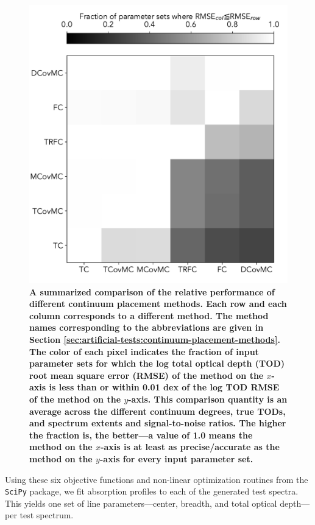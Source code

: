 \documentclass[trackchanges]{aastex62}
\begin{document}
{\begin{figure}
  \includegraphics[width=\linewidth]{figures/overall-performance.pdf}
  \caption{
  \bf
  A summarized comparison of the relative performance of different continuum placement methods.
  Each row and each column corresponds to a different method.
  The method names corresponding to the abbreviations are given in Section \ref{sec:artificial-tests:continuum-placement-methods}.
  The color of each pixel indicates the fraction of input parameter sets for which the log total optical depth (TOD) root mean square error (RMSE) of the method on the $x$-axis is less than or within 0.01 dex of the log TOD RMSE of the method on the $y$-axis.
  This comparison quantity is an average across the different continuum degrees, true TODs, and spectrum extents and signal-to-noise ratios.
  The higher the fraction is, the better---a value of 1.0 means the method on the $x$-axis is at least as precise/accurate as the method on the $y$-axis for every input parameter set.
  }
  \label{fig:outcomes-summary}
\end{figure}
Using these six objective functions and non-linear optimization routines from the \texttt{SciPy} package, we fit absorption profiles to each of the generated test spectra.
This yields one set of line parameters---center, breadth, and total optical depth---per test spectrum.
}
\end{document}

